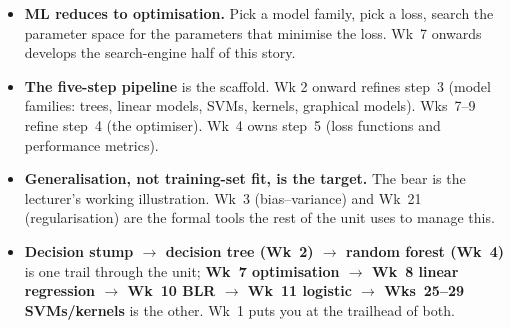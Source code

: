 \documentclass[11pt, a4paper]{article}
\begin{document}
\begin{tldrbox}
\begin{itemize}[leftmargin=*]
  \item \textbf{ML reduces to optimisation.} Pick a model family, pick a loss, search the parameter space for the parameters that minimise the loss. Wk~7 onwards develops the search-engine half of this story.
  \item \textbf{The five-step pipeline} is the scaffold. Wk 2 onward refines step~3 (model families: trees, linear models, SVMs, kernels, graphical models). Wks~7--9 refine step~4 (the optimiser). Wk~4 owns step~5 (loss functions and performance metrics).
  \item \textbf{Generalisation, not training-set fit, is the target.} The bear is the lecturer's working illustration. Wk~3 (bias--variance) and Wk~21 (regularisation) are the formal tools the rest of the unit uses to manage this.
  \item \textbf{Decision stump $\rightarrow$ decision tree (Wk~2) $\rightarrow$ random forest (Wk~4)} is one trail through the unit; \textbf{Wk~7 optimisation $\rightarrow$ Wk~8 linear regression $\rightarrow$ Wk~10 BLR $\rightarrow$ Wk~11 logistic $\rightarrow$ Wks~25--29 SVMs/kernels} is the other. Wk~1 puts you at the trailhead of both.
\end{itemize}
\end{tldrbox}
\end{document}
